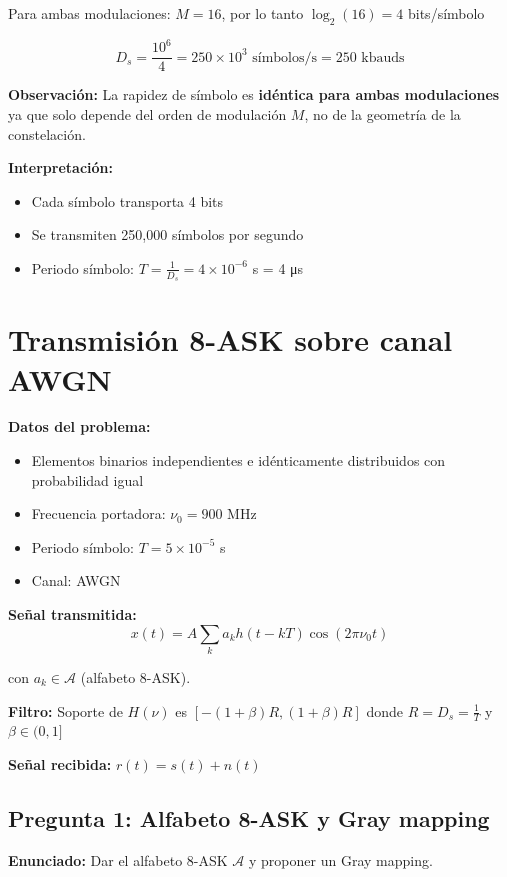 \documentclass[11pt,a4paper]{article}
\begin{document}
Para ambas modulaciones: $M = 16$, por lo tanto $\log_2(16) = 4$ bits/s\'imbolo

\[
\boxed{D_s = \frac{10^6}{4} = 250 \times 10^3 \text{ s\'imbolos/s} = 250 \text{ kbauds}}
\]

\textbf{Observaci\'on:} La rapidez de s\'imbolo es \textbf{id\'entica para ambas modulaciones} ya que solo depende del orden de modulaci\'on $M$, no de la geometr\'ia de la constelaci\'on.

\textbf{Interpretaci\'on:}
\begin{itemize}
    \item Cada s\'imbolo transporta 4 bits
    \item Se transmiten 250,000 s\'imbolos por segundo
    \item Periodo s\'imbolo: $T = \frac{1}{D_s} = 4 \times 10^{-6}$ s = 4 μs
\end{itemize}



\newpage
\section*{Transmisi\'on 8-ASK sobre canal AWGN}

\textbf{Datos del problema:}
\begin{itemize}
    \item Elementos binarios independientes e id\'enticamente distribuidos con probabilidad igual
    \item Frecuencia portadora: $\nu_0 = 900$ MHz
    \item Periodo s\'imbolo: $T = 5 \times 10^{-5}$ s
    \item Canal: AWGN
\end{itemize}

\textbf{Se\~nal transmitida:}
\[
x(t) = A\sum_k a_k h(t-kT)\cos(2\pi\nu_0 t)
\]

con $a_k \in \mathcal{A}$ (alfabeto 8-ASK).

\textbf{Filtro:} Soporte de $H(\nu)$ es $[-(1+\beta)R, (1+\beta)R]$ donde $R = D_s = \frac{1}{T}$ y $\beta \in (0,1]$

\textbf{Se\~nal recibida:} $r(t) = s(t) + n(t)$

\subsection*{Pregunta 1: Alfabeto 8-ASK y Gray mapping}

\textbf{Enunciado:} Dar el alfabeto 8-ASK $\mathcal{A}$ y proponer un Gray mapping.
\end{document}
